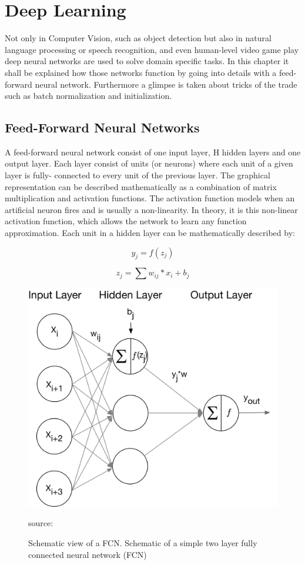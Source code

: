 \chapter{Deep Learning}

Not only in Computer Vision, such as object detection but also in natural language processing or speech recognition, and even human-level video game play deep neural networks are used to solve domain specific tasks. In this chapter it shall be explained how those networks function by going into details with a feed-forward neural network. Furthermore a glimpse is taken about tricks of the trade such as batch normalization and initialization.


\section{Feed-Forward Neural Networks}
A feed-forward neural network consist of one input layer, H hidden layers and one output layer. Each layer consist of units (or neurons) where each unit of a given layer is fully- connected to every unit of the previous layer. The graphical representation can be described mathematically as a combination of matrix multiplication and activation functions. The activation function models when an artificial neuron fires and is usually a non-linearity. In theory, it is this non-linear activation function, which allows the network to learn any function approximation. Each unit in a hidden layer can be mathematically described by:

\begin{equation}
	y_{j} = f(z_{j})
\end{equation}

\begin{equation}
z_{j} = \sum w_{ij}*x_{i} + b_{j}
\end{equation}

\begin{figure}[H]
	\centering
	\includegraphics[width=0.8\linewidth]{bilder/grundlagen/fast-forward.png}
	\caption{Schematic view of a FCN. Schematic of a simple two layer fully connected neural network (FCN)} source:\cite{Component}
	\label{fig:COMPONENT}
\end{figure}



